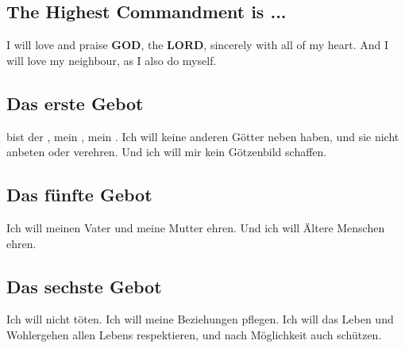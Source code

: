 \documentclass[12pt,a4paper]{article}
\newcommand{\God}[0]{\textbf{GOD}}
\newcommand{\Lord}[0]{\textbf{LORD}}
\begin{document}
	\subsection{The Highest Commandment is ...}
		I will love and praise {\God},
		the {\Lord},
		sincerely with all of my heart.
		And I will love my neighbour,
		as I also do myself.
		
	\subsection{Das erste Gebot}
		{\Du} bist der {\Herr},
		mein {\Gott},
		mein {\Erloeser}.
		Ich will keine anderen G\"otter neben {\Dir} haben,
		und sie nicht anbeten oder verehren.
		Und ich will mir kein G\"otzenbild schaffen.
		
%			
%		
		
	\subsection{Das f\"unfte Gebot}
		Ich will meinen Vater und meine Mutter ehren.
		Und ich will \"Altere Menschen ehren.
			
	\subsection{Das sechste Gebot}
		Ich will nicht t\"oten.
		Ich will meine Beziehungen pflegen.
		Ich will das Leben und Wohlergehen allen Lebens respektieren,
		und nach M\"oglichkeit auch sch\"utzen.
		
\end{document}
